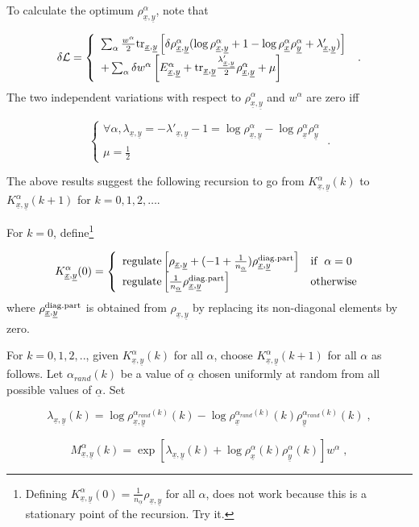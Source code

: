 \documentclass[12pt]{article}%
\newcommand{\tr}[0]{{\rm tr }}
\newcommand{\beq}{\begin{equation}}
\newcommand{\eeq}{\end{equation}}
\newcommand{\ul}[1]{\underline{#1}}
\newcommand{\rvx}[0]{{\ul{x}}}
\newcommand{\rvy}[0]{{\ul{y}}}
\newcommand{\lam}[0]{\lambda}
\newcommand{\rvalp}[0]{{\ul{\alpha}}}
\newcommand{\alp}[0]{{\alpha}}
\begin{document}
To calculate the optimum $\rho^\alp_{\rvx,\rvy}$, note that

\beq
\delta{\cal L}=\left\{
\begin{array}{l}
\sum_\alp \frac{w^\alp}{2}\tr_{\rvx, \rvy}\left[\delta\rho^\alp_{\rvx,\rvy}
(\log \rho^\alp_{\rvx,\rvy}+1
-\log \rho^{\alp}_{\rvx}
\rho^{\alp}_{\rvy}
+\lam'_{\rvx,\rvy})\right]\\
+\sum_\alp\delta w^\alp\left[
E^\alp_{\rvx,\rvy}
+\tr_{\rvx, \rvy}
\frac{\lam'_{\rvx,\rvy}}{2}
\rho^\alp_{\rvx,\rvy}
+\mu\right]
\end{array}
\right.
\;.
\eeq
The two independent variations with respect to $\rho^\alp_{\rvx,\rvy}$ 
and $w^\alp$ are zero iff

\beq
\left\{
\begin{array}{l}
\forall \alp,
\lam_{\rvx, \rvy}=-\lam'_{\rvx, \rvy}-1
=
\log \rho^{\alp}_{\rvx,\rvy}
-
\log \rho^{\alp}_{\rvx}
\rho^{\alp}_{\rvy}
\\
\mu=\frac{1}{2}
\end{array}
\right.
\;.
\eeq

The above results suggest
the following recursion to go from
$K^{\alp}_{\rvx,\rvy}(k)$
to $K^{\alp}_{\rvx,\rvy}(k+1)$ for $k=0,1,2,\ldots$.

For $k=0$, define\footnote{Defining $K^{\alp}_{\rvx,\rvy}(0)=
\frac{1}{n_\rvalp}\rho_{\rvx,\rvy}$ for all $\alp$, does not work because 
this is a stationary point of the recursion. Try it.}

\beq
K^{\alp}_{\rvx,\rvy}(0)=
\left\{
\begin{array}{ll}
{\rm regulate}\left[\rho_{\rvx,\rvy}+(-1+\frac{1}{n_\rvalp})\rho^{\rm diag.part}_{\rvx,\rvy}\right]&{\rm if}\;\; \alp=0\\
{\rm regulate}\left[\frac{1}{n_\rvalp}\rho^{\rm diag.part}_{\rvx,\rvy}\right]&{\rm otherwise}
\end{array}
\right.
\eeq
where $\rho^{\rm diag.part}_{\rvx,\rvy}$ is obtained from
$\rho_{\rvx,\rvy}$ by replacing its non-diagonal elements by zero.


For $k=0,1,2, ..$, given $K^{\alp}_{\rvx,\rvy}(k)$ for all $\alp$, 
choose $K^{\alp}_{\rvx,\rvy}(k+1)$ for all $\alp$ as follows.
Let
$\alp_{rand}(k)$ be a value of $\rvalp$ chosen uniformly  at random from all
possible values of $\rvalp$. Set

\beq
\lam_{\rvx, \rvy}(k)
=
\log \rho^{\alp_{rand}(k)}_{\rvx,\rvy}(k)
-
\log \rho^{\alp_{rand}(k)}_{\rvx}(k)
\rho^{\alp_{rand}(k)}_{\rvy}(k)
\;,
\eeq

\beq
M^\alp_{\rvx, \rvy}(k)=
\exp\left[
\lam_{\rvx, \rvy}(k)
+
\log \rho^{\alp}_{\rvx}(k)
\rho^{\alp}_{\rvy}(k)
\right]w^\alp
\;,
\eeq
\end{document}

